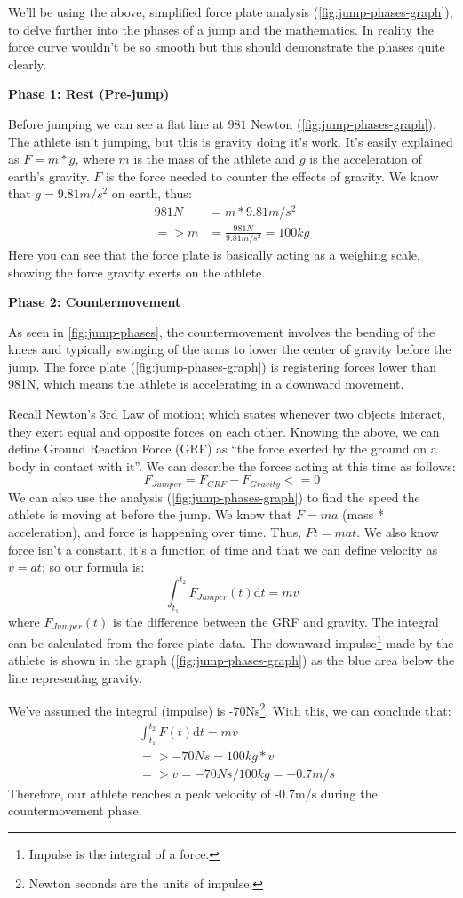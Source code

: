 We'll be using the above, simplified force plate analysis (\cref{fig:jump-phases-graph}),
to delve further into the phases of a jump and the mathematics. 
In reality the force curve wouldn't be so smooth
but this should demonstrate the phases quite clearly.
\par
\textbf{Phase 1: Rest (Pre-jump)}
\par
Before jumping we can see a flat line at $981$ Newton (\cref{fig:jump-phases-graph}). The athlete isn't jumping, but this is gravity doing it's
work. It's easily explained as $F=m*g$, where $m$ is the mass of the athlete and
$g$ is the acceleration of earth's gravity. $F$ is the force needed to counter the effects of gravity. We know that $g=9.81m/s^2$ on earth, thus:
\[
	\displaystyle
	\begin{aligned}
	981N &= m * 9.81 m/s^2 \\
	=> m &= \frac{981N}{9.81 m/s^2} = 100kg
	\end{aligned}	
\]
Here you can see that the force plate is basically acting as a weighing scale, showing
the force gravity exerts on the athlete.
\par
\textbf{Phase 2: Countermovement}
\par
As seen in \cref{fig:jump-phases}, the countermovement involves
the bending of the knees and typically swinging of the arms to lower the center
of gravity before the jump. The force plate (\cref{fig:jump-phases-graph}) is 
registering forces lower than 981N, which means the athlete is accelerating
in a downward movement.
\par
Recall Newton's 3rd Law of motion; 
which states whenever two objects interact, they exert equal and opposite forces on each other.
Knowing the above, we can define Ground Reaction Force (GRF) as ``the force exerted by the ground
on a body in contact with it''. 
We can describe the forces acting at this time as follows:
$$F_{Jumper} = F_{GRF} - F_{Gravity} <=0$$
We can also use the analysis (\cref{fig:jump-phases-graph}) to find
the speed the athlete is moving at before the jump. We know that
$F=ma$ (mass * acceleration), and force is happening over time.
Thus, $Ft=mat$.  
We also know force isn't a constant, it's a function of time and that we can define velocity as $v=at$;
so our formula is:
$$\displaystyle
\int_{t_1}^{t_2} F_{Jumper}(t) \mathrm{d}t = mv$$
where $F_{Jumper}(t)$ is the difference between the GRF and gravity.
\pagebreak
The integral can be calculated from the force plate data. The downward impulse\footnote{Impulse is the integral of a force.} made by
the athlete is shown in the graph (\cref{fig:jump-phases-graph}) as the blue area
below the line representing gravity.
\par
We've assumed the integral (impulse) is -70Ns\footnote{Newton seconds are the units of impulse.}. 
With this, we can conclude that:
\begin{align*}
& \int_{t_1}^{t_2} F(t) \mathrm{d}t = m v \\
&=> -70 N s = 100kg * v \\
&=> v = -70 N s / 100kg = -0.7 m/s
\end{align*}
Therefore, our athlete reaches a peak velocity of -0.7m/s during the countermovement phase.



